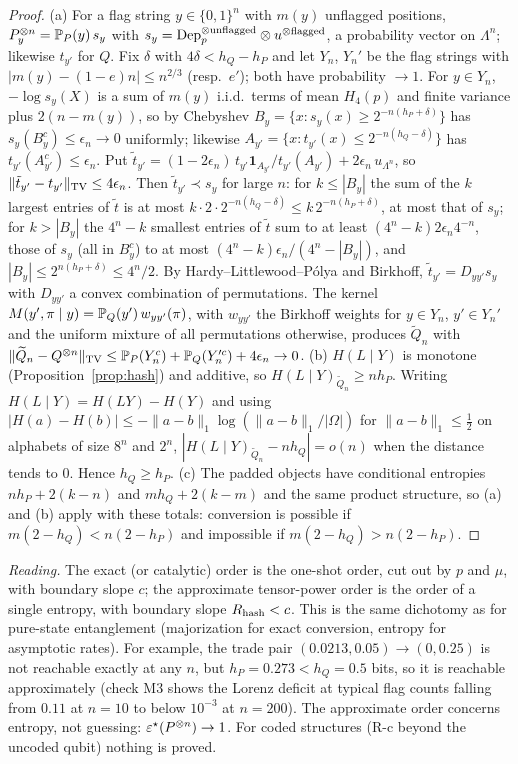 \begin{proof}
(a) For a flag string $y\in\{0,1\}^n$ with $m(y)$ unflagged positions, $P^{\otimes n}_y=\mathbb{P}_P(y)\,s_y$ with $s_y=\mathrm{Dep}_p^{\otimes\text{unflagged}}\otimes u^{\otimes\text{flagged}}$, a probability vector on $\Lambda^n$; likewise $t_{y'}$ for $Q$. Fix $\delta$ with $4\delta<h_Q-h_P$ and let $Y_n$, $Y_n'$ be the flag strings with $|m(y)-(1-e)n|\le n^{2/3}$ (resp.\ $e'$); both have probability $\to1$. For $y\in Y_n$, $-\log s_y(X)$ is a sum of $m(y)$ i.i.d.\ terms of mean $H_4(p)$ and finite variance plus $2(n-m(y))$, so by Chebyshev $B_y=\{x:s_y(x)\ge2^{-n(h_P+\delta)}\}$ has $s_y(B_y^c)\le\epsilon_n\to0$ uniformly; likewise $A_{y'}=\{x:t_{y'}(x)\le2^{-n(h_Q-\delta)}\}$ has $t_{y'}(A_{y'}^c)\le\epsilon_n$. Put $\tilde t_{y'}=(1-2\epsilon_n)\,t_{y'}\mathbf 1_{A_{y'}}/t_{y'}(A_{y'})+2\epsilon_n\,u_{\Lambda^n}$, so $\|\tilde t_{y'}-t_{y'}\|_{\rm TV}\le4\epsilon_n$. Then $\tilde t_{y'}\prec s_y$ for large $n$: for $k\le|B_y|$ the sum of the $k$ largest entries of $\tilde t$ is at most $k\cdot2\cdot2^{-n(h_Q-\delta)}\le k\,2^{-n(h_P+\delta)}$, at most that of $s_y$; for $k>|B_y|$ the $4^n-k$ smallest entries of $\tilde t$ sum to at least $(4^n-k)2\epsilon_n4^{-n}$, those of $s_y$ (all in $B_y^c$) to at most $(4^n-k)\epsilon_n/(4^n-|B_y|)$, and $|B_y|\le2^{n(h_P+\delta)}\le4^n/2$. By Hardy--Littlewood--P\'olya and Birkhoff, $\tilde t_{y'}=D_{yy'}s_y$ with $D_{yy'}$ a convex combination of permutations. The kernel $M(y',\pi\mid y)=\mathbb{P}_Q(y')\,w_{yy'}(\pi)$, with $w_{yy'}$ the Birkhoff weights for $y\in Y_n$, $y'\in Y_n'$ and the uniform mixture of all permutations otherwise, produces $\widetilde Q_n$ with $\|\widetilde Q_n-Q^{\otimes n}\|_{\rm TV}\le\mathbb{P}_P(Y_n^c)+\mathbb{P}_Q(Y_n'^c)+4\epsilon_n\to0$.
(b) $H(L\mid Y)$ is monotone (Proposition~\ref{prop:hash}) and additive, so $H(L\mid Y)_{\widetilde Q_n}\ge nh_P$. Writing $H(L\mid Y)=H(LY)-H(Y)$ and using $|H(a)-H(b)|\le-\|a-b\|_1\log(\|a-b\|_1/|\Omega|)$ for $\|a-b\|_1\le\tfrac12$ \cite[Thm.~17.3.3]{CT} on alphabets of size $8^n$ and $2^n$, $|H(L\mid Y)_{\widetilde Q_n}-nh_Q|=o(n)$ when the distance tends to $0$. Hence $h_Q\ge h_P$.
(c) The padded objects have conditional entropies $nh_P+2(k-n)$ and $mh_Q+2(k-m)$ and the same product structure, so (a) and (b) apply with these totals: conversion is possible if $m(2-h_Q)<n(2-h_P)$ and impossible if $m(2-h_Q)>n(2-h_P)$.
\end{proof}

\noindent \emph{Reading.} The exact (or catalytic) order is the one-shot order, cut out by $p$ and $\mu$, with boundary slope $c$; the approximate tensor-power order is the order of a single entropy, with boundary slope $R_{\rm hash}<c$. This is the same dichotomy as for pure-state entanglement (majorization for exact conversion, entropy for asymptotic rates). For example, the trade pair $(0.0213,0.05)\to(0,0.25)$ is not reachable exactly at any $n$, but $h_P=0.273<h_Q=0.5$ bits, so it is reachable approximately (check M3 shows the Lorenz deficit at typical flag counts falling from $0.11$ at $n=10$ to below $10^{-3}$ at $n=200$). The approximate order concerns entropy, not guessing: $\varepsilon^{\star}(P^{\otimes n})\to1$. For coded structures (R-c beyond the uncoded qubit) nothing is proved.


